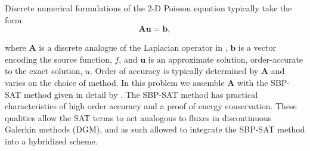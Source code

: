 %
%
%
Discrete numerical formulations of the 2-D Poisson eq\-uation typically take the form 
\begin{equation}
	\textbf{A} \textbf{u} = \textbf{b},
\end{equation}

\noindent
where $\textbf{A}$ is a discrete analogue of the Laplacian operator in , $\textbf{b}$ is a vector encoding the source function, $f$, and $\textbf{u}$ is an approximate solution, order-accurate to the exact solution, $u$. 
Order of accuracy is typically determined by $\textbf{A}$ and varies on the choice of method. 
In this problem we assemble $\textbf{A}$ with the SBP-SAT method given in detail by \citet{cheniterative}.
The SBP-SAT method has practical characteristics of high order accuracy and a proof of energy conservation. 
These qualities allow the SAT terms to act analogous to fluxes in discontinuous Galerkin methods (DGM), and as such allowed \citet{kozdon2021hybridized} to integrate the SBP-SAT method into a hybridized scheme. 
